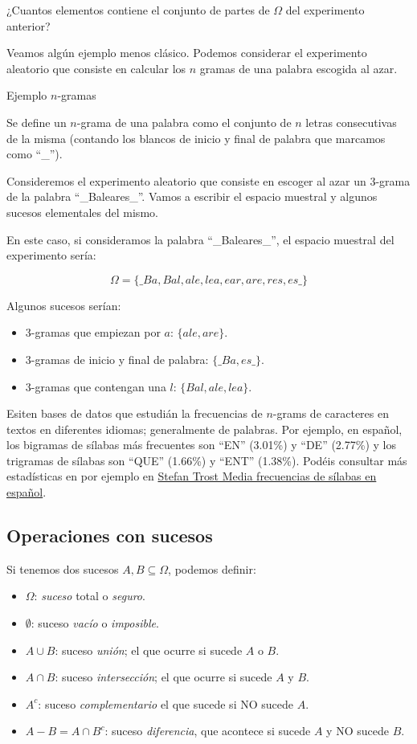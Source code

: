 \documentclass[
  letterpaper,
  DIV=11,
  numbers=noendperiod]{scrreprt}
\providecommand{\tightlist}{%
  \setlength{\itemsep}{0pt}\setlength{\parskip}{0pt}}\usepackage{longtable,booktabs,array}
\begin{document}
¿Cuantos elementos contiene el conjunto de partes de \(\Omega\) del
experimento anterior?

Veamos algún ejemplo menos clásico. Podemos considerar el experimento
aleatorio que consiste en calcular los \(n\) gramas de una palabra
escogida al azar.

Ejemplo \(n\)-gramas

Se define un \(n\)-grama de una palabra como el conjunto de \(n\) letras
consecutivas de la misma (contando los blancos de inicio y final de
palabra que marcamos como ``\_'').

Consideremos el experimento aleatorio que consiste en escoger al azar un
3-grama de la palabra ``\_Baleares\_''. Vamos a escribir el espacio
muestral y algunos sucesos elementales del mismo.

En este caso, si consideramos la palabra ``\_Baleares\_'', el espacio
muestral del experimento sería:

\[\Omega=\{\_Ba, Bal, ale, lea, ear, are, res, es\_\}\]

Algunos sucesos serían:

\begin{itemize}
\tightlist
\item
  3-gramas que empiezan por \(a\): \(\{ale,are\}.\)
\item
  3-gramas de inicio y final de palabra: \(\{\_Ba,es\_\}.\)
\item
  3-gramas que contengan una \(l\): \(\{Bal,ale,lea\}.\)
\end{itemize}

Esiten bases de datos que estudián la frecuencias de \(n\)-grams de
caracteres en textos en diferentes idiomas; generalmente de palabras.
Por ejemplo, en español, los bigramas de sílabas más frecuentes son
``EN'' (3.01\%) y ``DE'' (2.77\%) y los trigramas de sílabas son ``QUE''
(1.66\%) y ``ENT'' (1.38\%). Podéis consultar más estadísticas en por
ejemplo en
\href{https://es.sttmedia.com/frecuencias-de-silabas-espanol}{Stefan
Trost Media frecuencias de sílabas en español}.

\subsection{Operaciones con sucesos}\label{operaciones-con-sucesos}

Si tenemos dos sucesos \(A,B\subseteq \Omega\), podemos definir:

\begin{itemize}
\tightlist
\item
  \(\Omega\): \emph{suceso} total o \emph{seguro}.
\item
  \(\emptyset\): suceso \emph{vacío} o \emph{imposible}.
\item
  \(A\cup B\): suceso \emph{unión}; el que ocurre si sucede \(A\) o
  \(B\).
\item
  \(A\cap B\): suceso \emph{intersección}; el que ocurre si sucede \(A\)
  y \(B\).
\item
  \(A^c\): suceso \emph{complementario} el que sucede si NO sucede
  \(A\).
\item
  \(A- B=A\cap B^c\): suceso \emph{diferencia}, que acontece si sucede
  \(A\) y NO sucede \(B\).
\end{itemize}
\end{document}
